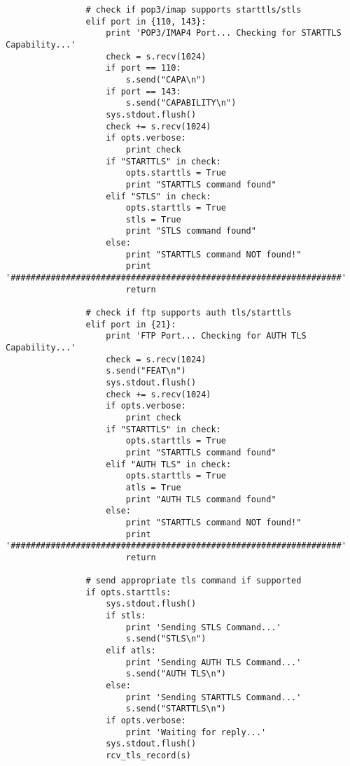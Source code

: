 \documentclass[a4paper,12pt]{article}
\begin{document}
\begin{verbatim}
                # check if pop3/imap supports starttls/stls                            
                elif port in {110, 143}:
                    print 'POP3/IMAP4 Port... Checking for STARTTLS Capability...'
                    check = s.recv(1024)
                    if port == 110:
                        s.send("CAPA\n")
                    if port == 143:
                        s.send("CAPABILITY\n")
                    sys.stdout.flush()
                    check += s.recv(1024)
                    if opts.verbose:
                        print check
                    if "STARTTLS" in check:
                        opts.starttls = True
                        print "STARTTLS command found"
                    elif "STLS" in check:
                        opts.starttls = True
                        stls = True
                        print "STLS command found"
                    else:
                        print "STARTTLS command NOT found!"
                        print '##################################################################'
                        return

                # check if ftp supports auth tls/starttls                          
                elif port in {21}:
                    print 'FTP Port... Checking for AUTH TLS Capability...'
                    check = s.recv(1024)
                    s.send("FEAT\n")
                    sys.stdout.flush()
                    check += s.recv(1024)
                    if opts.verbose:
                        print check
                    if "STARTTLS" in check:
                        opts.starttls = True
                        print "STARTTLS command found"
                    elif "AUTH TLS" in check:
                        opts.starttls = True
                        atls = True
                        print "AUTH TLS command found"
                    else:
                        print "STARTTLS command NOT found!"
                        print '##################################################################'
                        return     

                # send appropriate tls command if supported                        
                if opts.starttls:       
                    sys.stdout.flush()
                    if stls:
                        print 'Sending STLS Command...'
                        s.send("STLS\n")
                    elif atls:
                        print 'Sending AUTH TLS Command...'
                        s.send("AUTH TLS\n")
                    else:
                        print 'Sending STARTTLS Command...'
                        s.send("STARTTLS\n")
                    if opts.verbose:
                        print 'Waiting for reply...'
                    sys.stdout.flush()
                    rcv_tls_record(s)


\end{verbatim}
\end{document}
